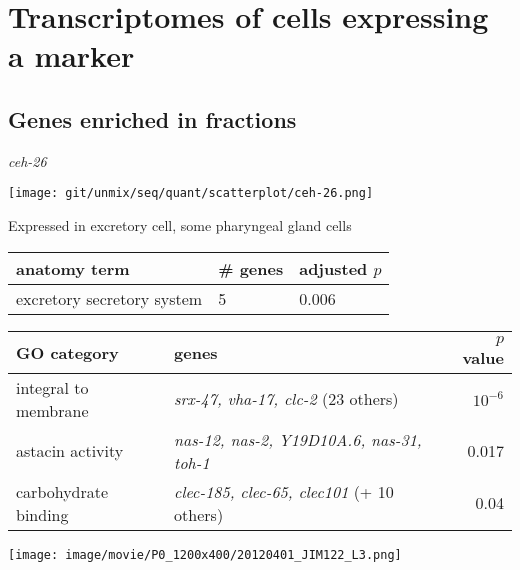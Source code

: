 \documentclass[serif,9pt]{beamer}
\begin{document}
\section{Transcriptomes of cells expressing a marker}

\subsection{Genes enriched in fractions}

\begin{frame}{{\em ceh-26}}

\begin{minipage}{0.4\textwidth}
\texttt{[image: git/unmix/seq/quant/scatterplot/ceh-26.png]}
\end{minipage}
\begin{minipage}{0.58\textwidth}

{\small Expressed in excretory cell, some pharyngeal gland cells}

\begin{table}[!tbp]\scriptsize
\begin{tabular}{lll}
anatomy term & \# genes & adjusted $p$ \\
\hline
excretory secretory system & 5 & 0.006 \\
\end{tabular}
\end{table}
\end{minipage}

\begin{table}\footnotesize
\begin{tabular}{llr}
GO category & genes & $p$ value \\
\hline
integral to membrane & {\em srx-47, vha-17, clc-2} (23 others) & $10^{-6}$ \\
astacin activity & {\em nas-12, nas-2, Y19D10A.6, nas-31, toh-1} & 0.017 \\
carbohydrate binding & {\em clec-185, clec-65, clec101} (+ 10 others) & 0.04 \\
\end{tabular}
\end{table}

\texttt{[image: image/movie/P0\_1200x400/20120401\_JIM122\_L3.png]}

\end{frame}
\end{document}
